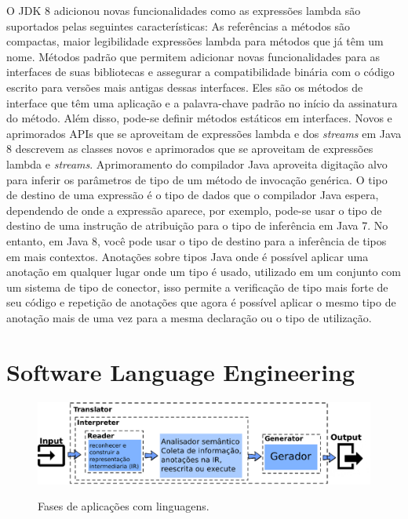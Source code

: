 O \acs{JDK} 8 adicionou novas funcionalidades como as expressões lambda são suportados pelas seguintes características: As referências a métodos são compactas, maior legibilidade expressões lambda para métodos que já têm um nome. Métodos padrão que permitem adicionar novas funcionalidades para as interfaces de suas bibliotecas e assegurar a compatibilidade binária com o código escrito para versões mais antigas dessas interfaces. Eles são os métodos de interface que têm uma aplicação e a palavra-chave padrão no início da assinatura do método. Além disso, pode-se definir métodos estáticos em interfaces. Novos e aprimorados APIs que se aproveitam de expressões lambda e dos {\it streams} em Java 8 descrevem as classes novos e aprimorados que se aproveitam de expressões lambda e {\it streams}. Aprimoramento do compilador Java aproveita digitação alvo para inferir os parâmetros de tipo de um método de invocação genérica. O tipo de destino de uma expressão é o tipo de dados que o compilador Java espera, dependendo de onde a expressão aparece, por exemplo, pode-se usar o tipo de destino de uma instrução de atribuição para o tipo de inferência em Java 7. No entanto, em Java 8, você pode usar o tipo de destino para a inferência de tipos em mais contextos. Anotações sobre tipos Java onde é possível aplicar uma anotação em qualquer lugar onde um tipo é usado, utilizado em um conjunto com um sistema de tipo de conector, isso permite a verificação de tipo mais forte de seu código e repetição de anotações que agora é possível aplicar o mesmo tipo de anotação mais de uma vez para a mesma declaração ou o tipo de utilização.






\section{Software Language Engineering}\label{sec:softEng}

\begin{figure}[h]
	\center
	\includegraphics[scale=0.9]{Imagens/stagesLanguageApp}
	\label{fig:stagesLanguageApp}
	\caption{Fases de aplicações com linguagens.}
\end{figure}

